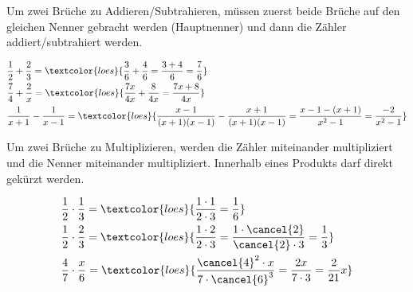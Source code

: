 \newpage
\begin{tcolorbox}
	Um zwei Brüche zu Addieren/Subtrahieren, müssen zuerst beide Brüche auf den gleichen Nenner gebracht werden (Hauptnenner) und dann die Zähler addiert/subtrahiert werden.
\end{tcolorbox}
\begin{bsp}
	\begin{align*}
		&\frac{1}{2}+\frac{2}{3}=\textcolor{loes}{\frac{3}{6}+\frac{4}{6}=\frac{3+4}{6}=\frac{7}{6}}\\
		&\frac{7}{4}+\frac{2}{x}=\textcolor{loes}{\frac{7x}{4x}+\frac{8}{4x}=\frac{7x+8}{4x}}\\
		&\frac{1}{x+1}-\frac{1}{x-1}=\textcolor{loes}{\frac{x-1}{(x+1)(x-1)}-\frac{x+1}{(x+1)(x-1)}=\frac{x-1-(x+1)}{x^2-1}=\frac{-2}{x^2-1}}
	\end{align*}
\end{bsp}

\begin{tcolorbox}
	Um zwei Brüche zu Multiplizieren, werden die Zähler miteinander multipliziert und die Nenner miteinander multipliziert. Innerhalb eines Produkts darf direkt gekürzt werden.
\end{tcolorbox}
\begin{bsp}
	\begin{align*}
		&\frac{1}{2}\cdot\frac{1}{3}=\textcolor{loes}{\frac{1\cdot 1}{2\cdot 3}=\frac{1}{6}}\\
		&\frac{1}{2}\cdot\frac{2}{3}=\textcolor{loes}{\frac{1\cdot 2}{2\cdot 3}=\frac{1\cdot \cancel{2}}{\cancel{2}\cdot 3}=\frac{1}{3}}\\
		&\frac{4}{7}\cdot\frac{x}{6}=\textcolor{loes}{\frac{\cancel{4}^2\cdot x}{7\cdot \cancel{6}^3}=\frac{2x}{7\cdot 3}=\frac{2}{21}x}
	\end{align*}
\end{bsp}

